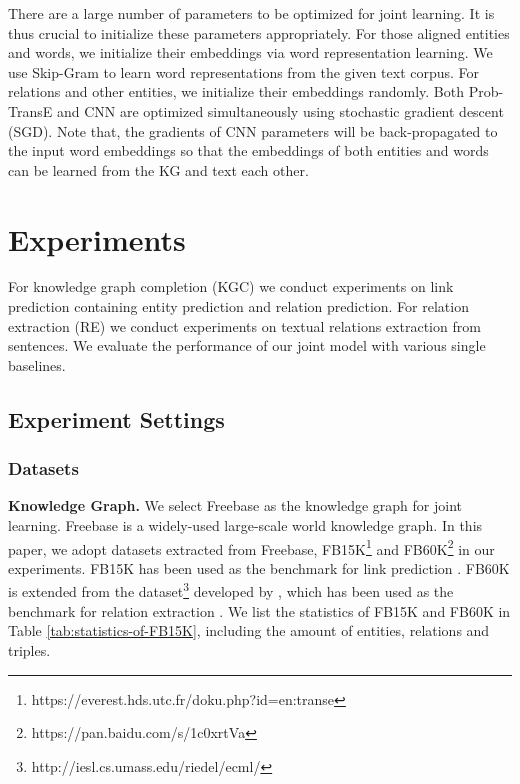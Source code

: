 \documentclass[11pt,a4paper]{article}
\begin{document}
There are a large number of parameters to be optimized for joint learning. It is thus crucial to initialize these parameters appropriately. For those aligned entities and words, we initialize their embeddings via word representation learning. We use Skip-Gram to learn word representations from the given text corpus. For relations and other entities, we initialize their embeddings randomly. Both Prob-TransE and CNN are optimized simultaneously using stochastic gradient descent (SGD). Note that, the gradients of CNN parameters will be back-propagated to the input word embeddings so that the embeddings of both entities and words can be learned from the KG and text each other.


\section{Experiments}

For knowledge graph completion (KGC) we conduct experiments on link prediction containing entity prediction and relation prediction. For relation extraction (RE) we conduct experiments on textual relations extraction from sentences. We evaluate the performance of our joint model with various single baselines. 

\subsection{Experiment Settings}

\subsubsection{Datasets}


\textbf{Knowledge Graph.} We select Freebase \cite{bollacker2008freebase} as the knowledge graph for joint learning. Freebase is a widely-used large-scale world knowledge graph. In this paper, we adopt datasets extracted from Freebase, FB15K\footnote{https://everest.hds.utc.fr/doku.php?id=en:transe} and FB60K\footnote{https://pan.baidu.com/s/1c0xrtVa} in our experiments. FB15K has been used as the benchmark for link prediction \cite{bordes2013translating,wang2014transh,lin2015learning,ji2015knowledge,he2015learning,xiao2015transg,ji2016knowledge}. FB60K is extended from the dataset\footnote{http://iesl.cs.umass.edu/riedel/ecml/} developed by \cite{riedel2010modeling}, which has been used as the benchmark for relation extraction \cite{riedel2010modeling,hoffmann2011knowledge,surdeanu2012multi,zeng2014relation,zeng2015distant,lin2016neural}. We list the statistics of FB15K and FB60K in Table \ref{tab:statistics-of-FB15K}, including the amount of entities, relations and triples.
\end{document}
